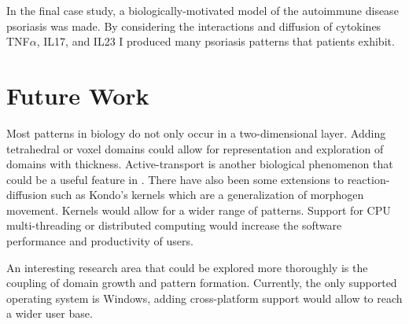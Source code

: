 In the final case study, a biologically-motivated model of the autoimmune disease psoriasis was made. By considering the interactions and diffusion of cytokines TNF$\alpha$, IL17, and IL23 I produced many psoriasis patterns that patients exhibit.





\section{Future Work}

Most patterns in biology do not only occur in a two-dimensional layer. Adding tetrahedral or voxel domains could allow for representation and exploration of domains with thickness. Active-transport is another biological phenomenon that could be a useful feature in \ProgramName{}. There have also been some extensions to reaction-diffusion such as Kondo's kernels which are a generalization of morphogen movement. Kernels would allow for a wider range of patterns. Support for CPU multi-threading or distributed computing would increase the software performance and productivity of users. 

An interesting research area that could be explored more thoroughly is the coupling of domain growth and pattern formation. Currently, the only supported operating system is Windows, adding cross-platform support would allow \ProgramName{} to reach a wider user base.
